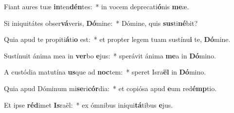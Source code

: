 \item Fiant aures tuæ \textbf{in}ten\textbf{dén}tes:~* in vocem deprecati\textbf{ó}nis \textbf{me}æ.
\item Si iniquitátes obser\textbf{vá}veris, \textbf{Dó}mine:~* Dómine, quis \textbf{sus}ti\textbf{né}bit?
\item Quia apud te propiti\textbf{á}ti\textbf{o} est:~* et propter legem tuam sustínu\textbf{i} te, \textbf{Dó}mine.
\item Sustínuit ánima mea in \textbf{ver}bo \textbf{e}jus:~* sperávit ánima \textbf{me}a in \textbf{Dó}mino.
\item A custódia matutína \textbf{us}que ad \textbf{noc}tem:~* speret Isra\textbf{ël} in \textbf{Dó}mino.
\item Quia apud Dóminum mi\textbf{se}ri\textbf{cór}dia:~* et copiósa apud \textbf{e}um red\textbf{émp}tio.
\item Et ipse \textbf{réd}imet \textbf{Is}raël:~* ex ómnibus iniqui\textbf{tá}tibus \textbf{e}jus.

